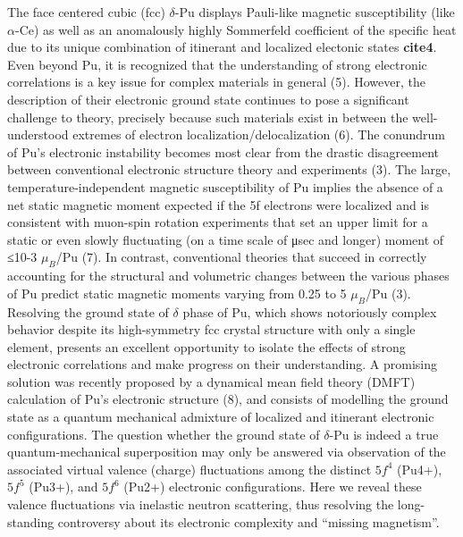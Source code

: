 \documentclass[10pt]{ruthesis}
\begin{document}
{The face centered cubic (fcc) $\delta$-Pu displays Pauli-like magnetic susceptibility (like $\alpha$-Ce)  as well as an anomalously highly  Sommerfeld coefficient of the specific heat  due to its unique combination of itinerant and localized electonic states  \textbf{cite{4}}. Even beyond Pu, it is recognized that the understanding of strong electronic correlations is a key issue for complex materials in general (5). However, the description of their electronic ground state continues to pose a significant challenge to theory, precisely because such materials exist in between the well-understood extremes of electron localization/delocalization (6).
The conundrum of Pu’s electronic instability becomes most clear from the drastic disagreement between conventional electronic structure theory and experiments (3). The large, temperature-independent magnetic susceptibility of Pu implies the absence of a net static magnetic moment expected if the 5f electrons were localized and is consistent with muon-spin rotation experiments that set an upper limit for a static or even slowly fluctuating (on a time scale of μsec and longer) moment of ≤10-3 $\mu_B$/Pu (7). In contrast, conventional theories that succeed in correctly accounting for the structural and volumetric changes between the various phases of Pu predict static magnetic moments varying from 0.25 to 5  $\mu_B$/Pu (3).
Resolving the ground state of $\delta$ phase of Pu, which shows notoriously complex behavior despite its high-symmetry fcc crystal structure with only a single element, presents an excellent opportunity to isolate the effects of strong electronic correlations and make progress on their understanding. A promising solution was recently proposed by a dynamical mean field theory (DMFT) calculation of Pu’s electronic structure (8), and consists of modelling the ground state as a quantum mechanical admixture of localized and itinerant electronic configurations. The question whether the ground state of $\delta$-Pu is indeed a true quantum-mechanical superposition may only be answered via observation of the associated virtual valence (charge) fluctuations among the distinct $5f^4$ (Pu4+), $5f^5$ (Pu3+), and $5f^6$ (Pu2+) electronic configurations. Here we reveal these valence fluctuations via inelastic neutron scattering, thus resolving the long-standing controversy about its electronic complexity and “missing magnetism”.
}
\end{document}
